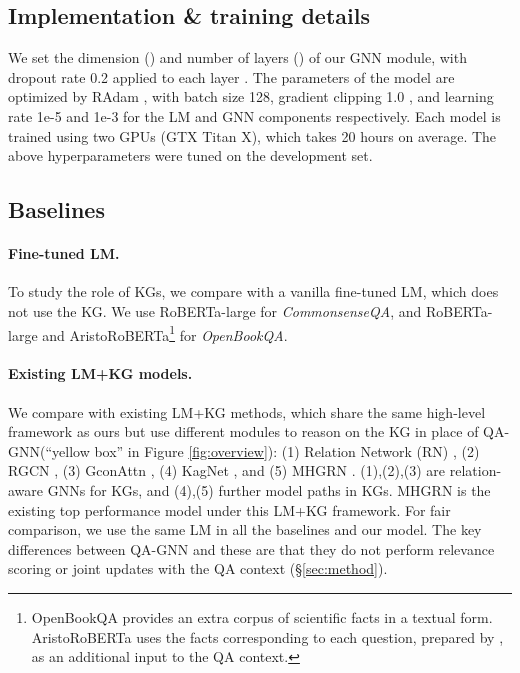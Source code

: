 \documentclass[11pt]{article}
\newcommand{\methodname}{QA-GNN\xspace}
\begin{document}
\subsection{Implementation \& training details}
We set the dimension () and number of layers () of our GNN module, with dropout rate
0.2 applied to each layer \cite{srivastava2014dropout}. 
The parameters of the model are optimized by RAdam \cite{liu2019variance}, with batch size 128, gradient clipping 1.0 \cite{pascanu2013difficulty}, and learning rate 1e-5 and 1e-3 for the LM and GNN components respectively. 
Each model is trained using two GPUs (GTX Titan X), which takes 20 hours on average.
The above hyperparameters were tuned on the development set.

\subsection{Baselines}
\paragraph{Fine-tuned LM.}
To study the role of KGs, we compare with a vanilla fine-tuned LM, which does not use the KG. We use RoBERTa-large \cite{liu2019roberta} for \textit{CommonsenseQA}, and RoBERTa-large and AristoRoBERTa\footnote{OpenBookQA provides an extra corpus of scientific {facts} in a textual form. AristoRoBERTa uses the facts corresponding to each question, prepared by \citet{clark2019f}, as an additional input to the QA context.\vspace{-0mm}} \cite{clark2019f} for \textit{OpenBookQA}.


\paragraph{Existing LM+KG models.}
We compare with existing LM+KG methods, which share the same high-level framework as ours but use different modules to reason on the KG in place of \methodname (``yellow box'' in Figure\! \ref{fig:overview}):
(1) Relation Network (RN) \cite{santoro2017simple}, (2) RGCN \cite{schlichtkrull2018modeling}, (3) GconAttn \cite{wang2019improving}, (4) KagNet \cite{lin2019kagnet}, and (5) MHGRN \cite{feng2020scalable}.
(1),(2),(3) are relation-aware GNNs for KGs, and (4),(5) further model paths in KGs. MHGRN is the existing top performance model under this LM+KG framework.
For fair comparison, we use the same LM in all the baselines and our model.
The key differences between \methodname and these are that they do not perform {relevance scoring} or {joint updates} with the QA context (\S \ref{sec:method}).
\end{document}
